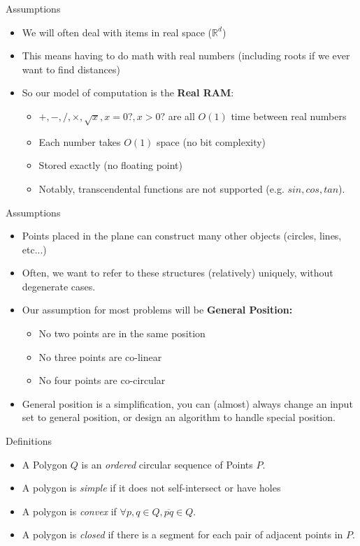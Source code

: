 \documentclass[aspectratio=169]{beamer}
\begin{document}
\begin{frame}{Assumptions}
    \begin{itemize}
        \item We will often deal with items in real space ($\mathbb{R}^d$)
        \item This means having to do math with real numbers (including roots if we ever want to find distances) \pause
        \item So our model of computation is the \textbf{Real RAM}: \pause
        \begin{itemize}
            \item $+,-,/,\times, \sqrt{x}, x=0?, x>0?$ are all $O(1)$ time between real numbers
            \item Each number takes $O(1)$ space (no bit complexity)
            \item Stored exactly (no floating point)
            \item Notably, transcendental functions are not supported (e.g. $sin, cos, tan$).
        \end{itemize}
    \end{itemize}
\end{frame}

\begin{frame}{Assumptions}
    \begin{itemize}
        \item Points placed in the plane can construct many other objects (circles, lines, etc...) \pause
        \item Often, we want to refer to these structures (relatively) uniquely, without degenerate cases. \pause
        \item Our assumption for most problems will be \textbf{General Position:} \pause
        \begin{itemize}
            \item No two points are in the same position
            \item No three points are co-linear
            \item No four points are co-circular \pause
        \end{itemize}
        \item General position is a simplification, you can (almost) always change an input set to general position, or design an algorithm to handle special position.
    \end{itemize}
\end{frame}

\begin{frame}{Definitions}
    \begin{itemize}
        \item A Polygon $Q$ is an \textit{ordered} circular sequence of Points $P$.
        \item A polygon is \textit{simple} if it does not self-intersect or have holes
        \item A polygon is \textit{convex} if $\forall p,q \in Q, \overline{pq} \in Q$.
        \item A polygon is \textit{closed} if there is a segment for each pair of adjacent points in $P$.
    \end{itemize}
\end{frame}
\end{document}
